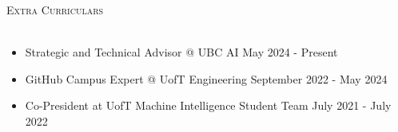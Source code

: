 \documentclass[a4paper]{article}
\newcommand{\lineunder} {
    \vspace*{-8pt} \\
    \hspace*{-18pt} \hrulefill \\
}
\newcommand{\header} [1] {
    {\hspace*{-18pt}\vspace*{6pt} \textsc{#1}}
    \vspace*{-6pt} \lineunder
}
\begin{document}
\vspace{1mm}
\header{Extra Curriculars}
\vspace{-3mm}
\begin{itemize} \itemsep 0.5pt
    \item \begin{small} Strategic and Technical Advisor @ UBC AI \hfill May 2024 - Present \end{small}
	\vspace{-2mm}
	\item \begin{small} GitHub Campus Expert @ UofT Engineering \hfill September 2022 - May 2024 \end{small}
	\vspace{-2mm}
    \item \begin{small} Co-President at UofT Machine Intelligence Student Team \hfill July 2021 - July 2022 \end{small}
	\vspace{-2mm}
\end{itemize}
\end{document}

